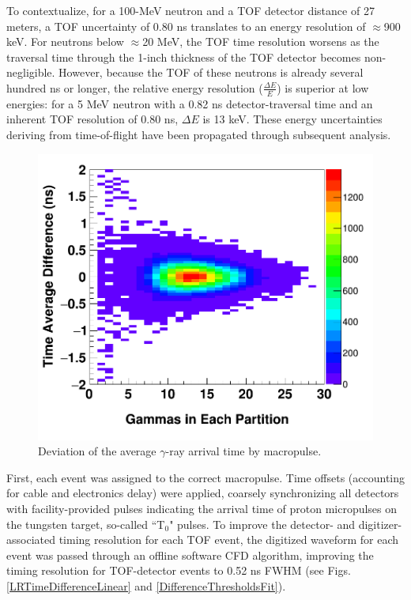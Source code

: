 To contextualize, for a 100-MeV neutron and a TOF detector distance of 27 meters, a TOF 
uncertainty of 0.80 ns translates to an energy resolution of $\approx$900 keV.
For neutrons below $\approx$20 MeV, the TOF time resolution worsens as the traversal time 
through the 1-inch thickness of the TOF detector becomes non-negligible.
However, because the TOF of these neutrons is already several hundred ns or
longer, the relative energy resolution ($\frac{\Delta E}{E}$) is
superior at low energies: for a 5 MeV neutron with a 0.82 ns detector-traversal time and
an inherent TOF resolution of 0.80 ns, $\Delta E$ is 13 keV. These energy uncertainties
deriving from time-of-flight have been propagated through subsequent analysis.

\begin{figure}
    \includegraphics[scale=0.24]{figures/gammaCorrection2D.png}
    \caption[Deviation of the average $\gamma$-ray arrival time by macropulse]
    {Deviation of the average $\gamma$-ray arrival time by macropulse. }
    \label{GammaCorrection}
\end{figure}

First, each event was assigned to the correct macropulse.
Time offsets (accounting for cable and
electronics delay) were applied, coarsely synchronizing all detectors with
facility-provided pulses indicating the arrival time of proton micropulses on the
tungsten target, so-called ``T$_{0}$" pulses.
To improve the detector- and digitizer-associated timing resolution for each TOF
event, the digitized waveform for each event was passed 
through an offline software CFD algorithm, improving the timing resolution 
for TOF-detector events to 0.52 ns FWHM (see Figs. \ref{LRTimeDifferenceLinear}
and \ref{DifferenceThresholdsFit}).



